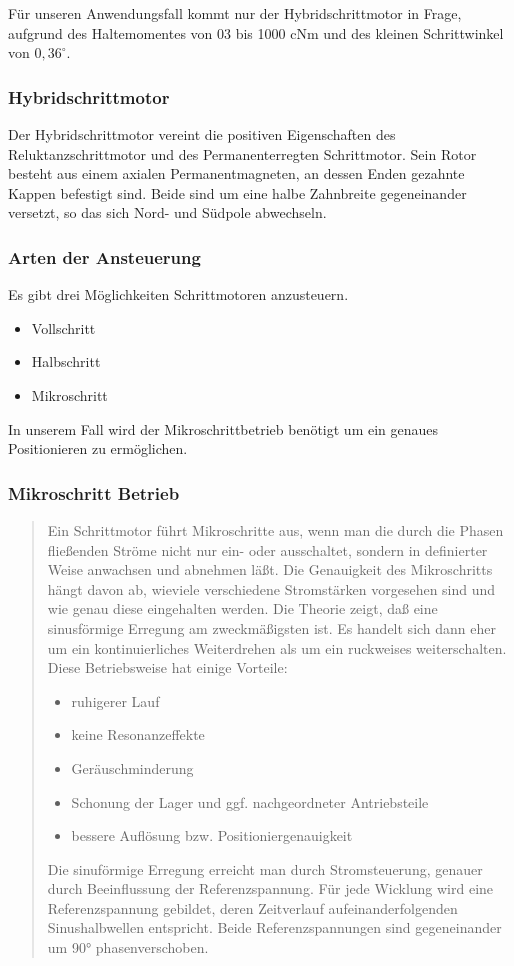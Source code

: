 Für unseren Anwendungsfall kommt nur der Hybridschrittmotor in Frage, aufgrund des Haltemomentes von 03 bis 1000 cNm und des kleinen Schrittwinkel von $0,36^\circ$.

\subsubsection*{Hybridschrittmotor}
Der Hybridschrittmotor vereint die positiven Eigenschaften des Reluktanzschrittmotor und des Permanenterregten Schrittmotor. Sein Rotor besteht aus einem axialen Permanentmagneten, an dessen Enden gezahnte Kappen befestigt sind. Beide sind um eine halbe Zahnbreite gegeneinander versetzt, so das sich Nord- und Südpole abwechseln.

\subsubsection{Arten der Ansteuerung}
Es gibt drei Möglichkeiten Schrittmotoren anzusteuern.
\begin{itemize}
	\item Vollschritt
	\item Halbschritt
	\item Mikroschritt
\end{itemize}

In unserem Fall wird der Mikroschrittbetrieb benötigt um ein genaues Positionieren zu ermöglichen.
\subsubsection*{Mikroschritt Betrieb}

\begin{quote}
	
Ein Schrittmotor führt Mikroschritte aus, wenn man die durch die Phasen fließenden Ströme nicht nur ein- oder ausschaltet, sondern in definierter Weise anwachsen und abnehmen läßt. Die Genauigkeit des Mikroschritts hängt davon ab, wieviele verschiedene Stromstärken vorgesehen sind und wie genau diese eingehalten werden. Die Theorie zeigt, daß eine sinusförmige Erregung am zweckmäßigsten ist. Es handelt sich dann eher um ein kontinuierliches Weiterdrehen als um ein ruckweises weiterschalten. Diese Betriebsweise hat einige Vorteile: 
\begin{itemize}
	\item ruhigerer Lauf
	\item keine Resonanzeffekte
	\item Geräuschminderung
	\item Schonung der Lager und ggf. nachgeordneter Antriebsteile
	\item bessere Auflösung bzw. Positioniergenauigkeit
\end{itemize}

Die sinuförmige Erregung erreicht man durch Stromsteuerung, genauer durch Beeinflussung der Referenzspannung. Für jede Wicklung wird eine Referenzspannung gebildet, deren Zeitverlauf aufeinanderfolgenden Sinushalbwellen  entspricht. Beide Referenzspannungen sind gegeneinander um 90° phasenverschoben.

\end{quote}




